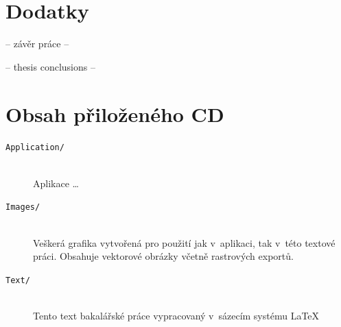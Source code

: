 \documentclass[glossaries, index]{kidiplom}
\begin{document}
\section{Dodatky}





\begin{kiconclusions}
-- závěr práce --
\end{kiconclusions}

\begin{kiconclusions}[english]
-- thesis conclusions --
\end{kiconclusions}

\appendix



\section{Obsah přiloženého CD} \label{sec:ObsahCD}

\begin{description}

\item[\texttt{Application/}] \hfill \\
  Aplikace \dots
  
\item[\texttt{Images/}] \hfill \\
  Veškerá grafika vytvořená pro použití jak v~aplikaci, tak v~této textové práci. Obsahuje vektorové obrázky včetně rastrových exportů.
  
\item[\texttt{Text/}] \hfill \\
  Tento text bakalářské práce vypracovaný v~sázecím systému \LaTeX
  
\end{description}



\newpage




\end{document}
